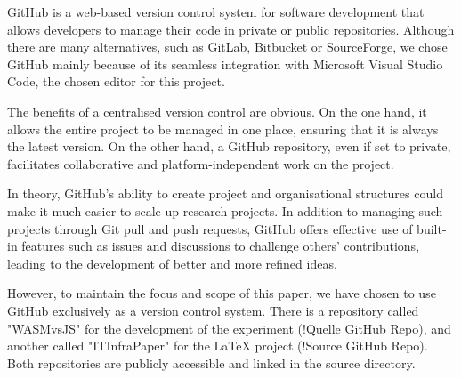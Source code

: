 GitHub is a web-based version control system for software development that allows developers to manage their code in private or public repositories. Although there are many alternatives, such as GitLab, Bitbucket or SourceForge, we chose GitHub mainly because of its seamless integration with Microsoft Visual Studio Code, the chosen editor for this project.

The benefits of a centralised version control are obvious. On the one hand, it allows the entire project to be managed in one place, ensuring that it is always the latest version. On the other hand, a GitHub repository, even if set to private, facilitates collaborative and platform-independent work on the project.

In theory, GitHub's ability to create project and organisational structures could make it much easier to scale up research projects. In addition to managing such projects through Git pull and push requests, GitHub offers effective use of built-in features such as issues and discussions to challenge others' contributions, leading to the development of better and more refined ideas.

However, to maintain the focus and scope of this paper, we have chosen to use GitHub exclusively as a version control system. There is a repository called "WASMvsJS" for the development of the experiment (!Quelle GitHub Repo), and another called "ITInfraPaper" for the \LaTeX{} project (!Source GitHub Repo). Both repositories are publicly accessible and linked in the source directory.